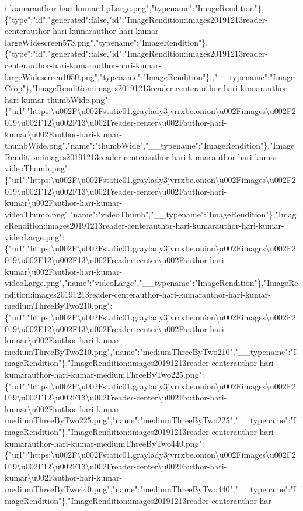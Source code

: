 i-kumarauthor-hari-kumar-hpLarge.png","typename":"ImageRendition"\},\{"type":"id","generated":false,"id":"ImageRendition:images20191213reader-centerauthor-hari-kumarauthor-hari-kumar-largeWidescreen573.png","typename":"ImageRendition"\},\{"type":"id","generated":false,"id":"ImageRendition:images20191213reader-centerauthor-hari-kumarauthor-hari-kumar-largeWidescreen1050.png","typename":"ImageRendition"\}{]},"\_\_typename":"ImageCrop"\},"ImageRendition:images20191213reader-centerauthor-hari-kumarauthor-hari-kumar-thumbWide.png":\{"url":"https:\textbackslash{}u002F\textbackslash{}u002Fstatic01.graylady3jvrrxbe.onion\textbackslash{}u002Fimages\textbackslash{}u002F2019\textbackslash{}u002F12\textbackslash{}u002F13\textbackslash{}u002Freader-center\textbackslash{}u002Fauthor-hari-kumar\textbackslash{}u002Fauthor-hari-kumar-thumbWide.png","name":"thumbWide","\_\_typename":"ImageRendition"\},"ImageRendition:images20191213reader-centerauthor-hari-kumarauthor-hari-kumar-videoThumb.png":\{"url":"https:\textbackslash{}u002F\textbackslash{}u002Fstatic01.graylady3jvrrxbe.onion\textbackslash{}u002Fimages\textbackslash{}u002F2019\textbackslash{}u002F12\textbackslash{}u002F13\textbackslash{}u002Freader-center\textbackslash{}u002Fauthor-hari-kumar\textbackslash{}u002Fauthor-hari-kumar-videoThumb.png","name":"videoThumb","\_\_typename":"ImageRendition"\},"ImageRendition:images20191213reader-centerauthor-hari-kumarauthor-hari-kumar-videoLarge.png":\{"url":"https:\textbackslash{}u002F\textbackslash{}u002Fstatic01.graylady3jvrrxbe.onion\textbackslash{}u002Fimages\textbackslash{}u002F2019\textbackslash{}u002F12\textbackslash{}u002F13\textbackslash{}u002Freader-center\textbackslash{}u002Fauthor-hari-kumar\textbackslash{}u002Fauthor-hari-kumar-videoLarge.png","name":"videoLarge","\_\_typename":"ImageRendition"\},"ImageRendition:images20191213reader-centerauthor-hari-kumarauthor-hari-kumar-mediumThreeByTwo210.png":\{"url":"https:\textbackslash{}u002F\textbackslash{}u002Fstatic01.graylady3jvrrxbe.onion\textbackslash{}u002Fimages\textbackslash{}u002F2019\textbackslash{}u002F12\textbackslash{}u002F13\textbackslash{}u002Freader-center\textbackslash{}u002Fauthor-hari-kumar\textbackslash{}u002Fauthor-hari-kumar-mediumThreeByTwo210.png","name":"mediumThreeByTwo210","\_\_typename":"ImageRendition"\},"ImageRendition:images20191213reader-centerauthor-hari-kumarauthor-hari-kumar-mediumThreeByTwo225.png":\{"url":"https:\textbackslash{}u002F\textbackslash{}u002Fstatic01.graylady3jvrrxbe.onion\textbackslash{}u002Fimages\textbackslash{}u002F2019\textbackslash{}u002F12\textbackslash{}u002F13\textbackslash{}u002Freader-center\textbackslash{}u002Fauthor-hari-kumar\textbackslash{}u002Fauthor-hari-kumar-mediumThreeByTwo225.png","name":"mediumThreeByTwo225","\_\_typename":"ImageRendition"\},"ImageRendition:images20191213reader-centerauthor-hari-kumarauthor-hari-kumar-mediumThreeByTwo440.png":\{"url":"https:\textbackslash{}u002F\textbackslash{}u002Fstatic01.graylady3jvrrxbe.onion\textbackslash{}u002Fimages\textbackslash{}u002F2019\textbackslash{}u002F12\textbackslash{}u002F13\textbackslash{}u002Freader-center\textbackslash{}u002Fauthor-hari-kumar\textbackslash{}u002Fauthor-hari-kumar-mediumThreeByTwo440.png","name":"mediumThreeByTwo440","\_\_typename":"ImageRendition"\},"ImageRendition:images20191213reader-centerauthor-har